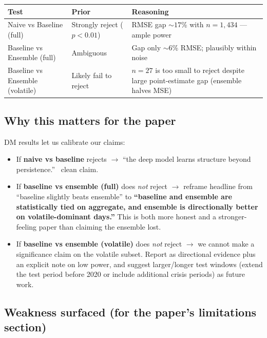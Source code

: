 \documentclass[11pt]{article}
\begin{document}
\begin{center}
\renewcommand{\arraystretch}{1.15}
\begin{tabular}{@{}p{4.8cm} p{4cm} p{5.8cm}@{}}
\toprule
Test & Prior & Reasoning \\
\midrule
Naive vs Baseline (full)            & Strongly reject ($p < 0.01$) & RMSE gap ${\sim}17$\% with $n=1{,}434$ --- ample power \\
Baseline vs Ensemble (full)         & Ambiguous                     & Gap only ${\sim}6$\% RMSE; plausibly within noise \\
Baseline vs Ensemble (volatile)     & Likely fail to reject         & $n=27$ is too small to reject despite large point-estimate gap (ensemble halves MSE) \\
\bottomrule
\end{tabular}
\end{center}

\subsection*{Why this matters for the paper}

DM results let us calibrate our claims:

\begin{itemize}[leftmargin=*]
  \item If \textbf{naive vs baseline} rejects $\to$ ``the deep model learns structure beyond persistence.'' \checkmark\ clean claim.
  \item If \textbf{baseline vs ensemble (full)} does \emph{not} reject $\to$ reframe headline from ``baseline slightly beats ensemble'' to \textbf{``baseline and ensemble are statistically tied on aggregate, and ensemble is directionally better on volatile-dominant days.''} This is both more honest and a stronger-feeling paper than claiming the ensemble lost.
  \item If \textbf{baseline vs ensemble (volatile)} does \emph{not} reject $\to$ we cannot make a significance claim on the volatile subset. Report as directional evidence plus an explicit note on low power, and suggest larger/longer test windows (extend the test period before 2020 or include additional crisis periods) as future work.
\end{itemize}

\subsection*{Weakness surfaced (for the paper's limitations section)}
\end{document}
